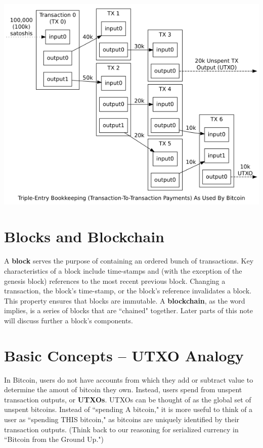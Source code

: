 \documentclass[11pt]{article}
\begin{document}
    \includegraphics[scale=0.9]{transactions}
    
    \section*{Blocks and Blockchain}
    
    A \textbf{block} serves the purpose of containing an ordered bunch of transactions. Key characteristics of a block include time-stamps and (with the exception of the genesis block) references to the most recent previous block. Changing a transaction, the block's time-stamp, or the block's reference invalidates a block. This property ensures that blocks are immutable. A \textbf{blockchain}, as the word implies, is a series of blocks that are ``chained" together. Later parts of this note will discuss further a block's components.
       
   \section*{Basic Concepts -- UTXO Analogy}
   
    In Bitcoin, users do not have accounts from which they add or subtract value to determine the amout of bitcoin they own. Instead, users spend from unspent transaction outputs, or \textbf{UTXOs}. UTXOs can be thought of as the global set of unspent bitcoins. Instead of ``spending A bitcoin," it is more useful to think of a user as ``spending THIS bitcoin," as bitcoins are uniquely identified by their transaction outputs. (Think back to our reasoning for serialized currency in ``Bitcoin from the Ground Up.")
    
\end{document}
